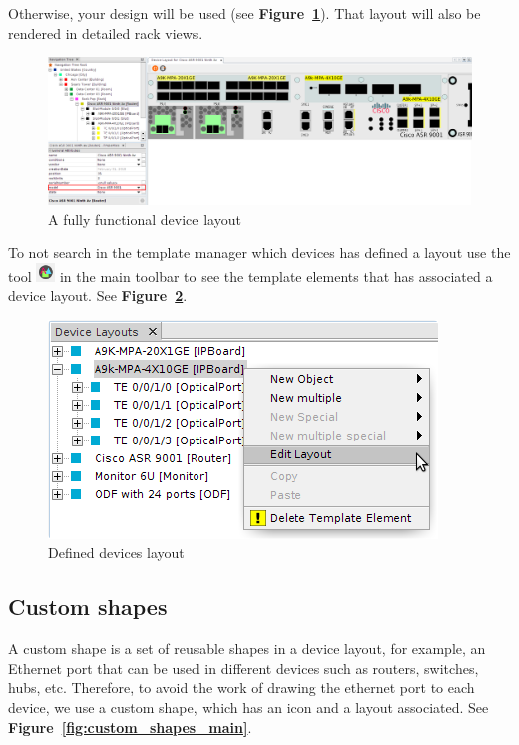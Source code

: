 \documentclass[a4paper]{article}
\begin{document}
	Otherwise, your design will be used (see \textbf{Figure~\ref{fig:device_layout_render}}). That layout will also be rendered in detailed rack views.
	
	\begin{figure}[h!]
		\centering
		\includegraphics[width=0.99\linewidth]{img/device_layout_show.png}
		\caption{A fully functional device layout}
		\label{fig:device_layout_render}
	\end{figure}
	
	To not search in the template manager which devices has defined a layout use the tool \includegraphics[width=0.5cm]{img/icon_devices_layouts.png} in the main toolbar to see the template elements that has associated a device layout. See \textbf{Figure~\ref{fig:device_layout_all}}.
	
	\begin{figure}[h!]
		\centering
		\includegraphics[width=0.4\linewidth]{img/device_layout_all.png}
		\caption{Defined devices layout}
		\label{fig:device_layout_all}
	\end{figure}
	\newpage
			
	\subsection{Custom shapes} \label{sec:custom_shapes}
	
	A custom shape is a set of reusable shapes in a device layout, for example, an Ethernet port that can be used in different devices such as routers, switches, hubs, etc. Therefore, to avoid the work of drawing the ethernet port to each device, we use a custom shape, which has an icon and a layout associated. See \textbf{Figure~\ref{fig:custom_shapes_main}}.
	
\end{document}
